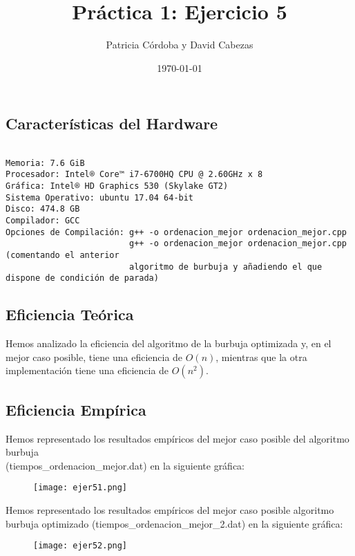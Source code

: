 \documentclass{article}
\begin{document}
\title{Práctica 1: Ejercicio 5}
\author{Patricia Córdoba y David Cabezas}
\date{\today}
\maketitle

\subsection*{Características del Hardware}
\begin{verbatim}

Memoria: 7.6 GiB
Procesador: Intel® Core™ i7-6700HQ CPU @ 2.60GHz x 8
Gráfica: Intel® HD Graphics 530 (Skylake GT2)
Sistema Operativo: ubuntu 17.04 64-bit
Disco: 474.8 GB
Compilador: GCC
Opciones de Compilación: g++ -o ordenacion_mejor ordenacion_mejor.cpp
                         g++ -o ordenacion_mejor ordenacion_mejor.cpp (comentando el anterior 
                         algoritmo de burbuja y añadiendo el que dispone de condición de parada)

\end{verbatim}

\subsection*{Eficiencia Teórica}

\begin{justify}
  Hemos analizado la eficiencia del algoritmo de la burbuja optimizada y, en el mejor caso posible, tiene una eficiencia de $O(n)$, mientras que la otra implementación tiene una eficiencia de $O(n^2)$.
\end{justify}

\subsection*{Eficiencia Empírica}

\begin{justify}
  Hemos representado los resultados empíricos del mejor caso posible
  del algoritmo burbuja \\ (tiempos\_ordenacion\_mejor.dat) en la
  siguiente gráfica:
\end{justify}

\begin{figure}[H]
  \centering
  \texttt{[image: ejer51.png]}
\end{figure}

\begin{justify}
  \newpage
  Hemos representado los resultados empíricos del mejor caso posible
  algoritmo burbuja optimizado (tiempos\_ordenacion\_mejor\_2.dat) en la
  siguiente gráfica:
\end{justify}

\begin{figure}[H]
  \centering
  \texttt{[image: ejer52.png]}
\end{figure}
\end{document}
